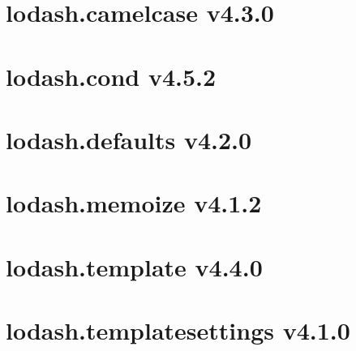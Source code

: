 \documentclass[twoside]{book}
\newcommand{\+}{\discretionary{\mbox{\scriptsize$\hookleftarrow$}}{}{}}
\begin{document}
\chapter{lodash.\+camelcase v4.3.0}
\label{md__c_1_workspace_demo_src_main_script_node_modules_lodash_8camelcase__r_e_a_d_m_e}

\chapter{lodash.\+cond v4.5.2}
\label{md__c_1_workspace_demo_src_main_script_node_modules_lodash_8cond__r_e_a_d_m_e}

\chapter{lodash.\+defaults v4.2.0}
\label{md__c_1_workspace_demo_src_main_script_node_modules_lodash_8defaults__r_e_a_d_m_e}

\chapter{lodash.\+memoize v4.1.2}
\label{md__c_1_workspace_demo_src_main_script_node_modules_lodash_8memoize__r_e_a_d_m_e}

\chapter{lodash.\+template v4.4.0}
\label{md__c_1_workspace_demo_src_main_script_node_modules_lodash_8template__r_e_a_d_m_e}

\chapter{lodash.\+templatesettings v4.1.0}
\label{md__c_1_workspace_demo_src_main_script_node_modules_lodash_8templatesettings__r_e_a_d_m_e}

\end{document}
